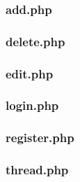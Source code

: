 \documentclass[a4paper,10pt]{article}
\begin{document}
\subsubsection{add.php}
\subsubsection{delete.php}
\subsubsection{edit.php}
\subsubsection{login.php}
\subsubsection{register.php}
\subsubsection{thread.php}
\end{document}

